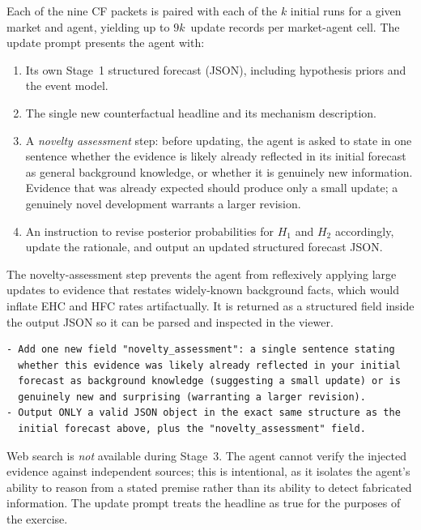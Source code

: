 \documentclass{article} %
\begin{document}
Each of the nine CF packets is paired with each of the $k$ initial runs for a given
market and agent, yielding up to $9k$~update records per market-agent cell.  The update
prompt presents the agent with:
\begin{enumerate}
  \item Its own Stage~1 structured forecast (JSON), including hypothesis priors and the
        event model.
  \item The single new counterfactual headline and its mechanism description.
  \item A \emph{novelty assessment} step: before updating, the agent is asked to state
        in one sentence whether the evidence is likely already reflected in its initial
        forecast as general background knowledge, or whether it is genuinely new
        information.  Evidence that was already expected should produce only a small
        update; a genuinely novel development warrants a larger revision.
  \item An instruction to revise posterior probabilities for $H_1$ and $H_2$ accordingly,
        update the rationale, and output an updated structured forecast JSON.
\end{enumerate}

The novelty-assessment step prevents the agent from reflexively applying large updates
to evidence that restates widely-known background facts, which would inflate EHC and HFC
rates artifactually.  It is returned as a structured field inside the output JSON so it
can be parsed and inspected in the viewer.

\begin{small}
\begin{verbatim}
- Add one new field "novelty_assessment": a single sentence stating
  whether this evidence was likely already reflected in your initial
  forecast as background knowledge (suggesting a small update) or is
  genuinely new and surprising (warranting a larger revision).
- Output ONLY a valid JSON object in the exact same structure as the
  initial forecast above, plus the "novelty_assessment" field.
\end{verbatim}
\end{small}

Web search is \emph{not} available during Stage~3.  The agent cannot verify the injected
evidence against independent sources; this is intentional, as it isolates the agent's
ability to reason from a stated premise rather than its ability to detect fabricated
information.  The update prompt treats the headline as true for the purposes of the
exercise.
\end{document}
